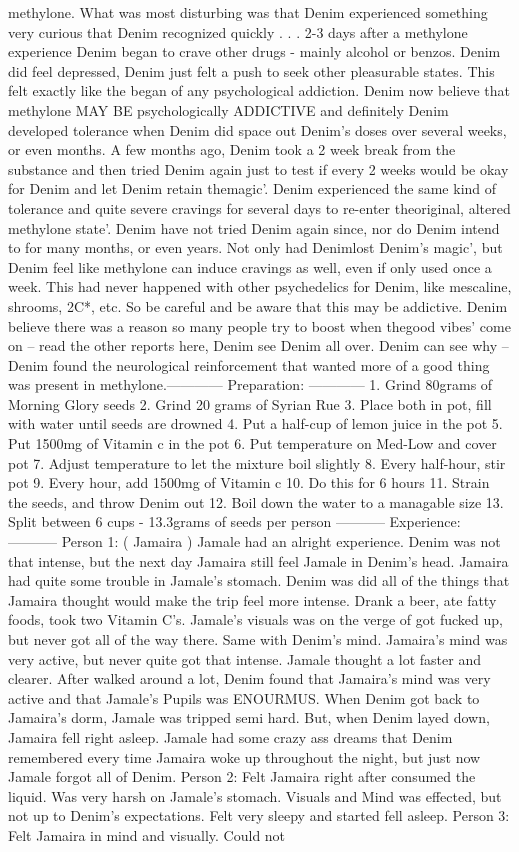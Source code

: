 \documentclass[12pt]{book}
\begin{document}
methylone. What was most disturbing was that Denim experienced something very curious that Denim recognized quickly . . .  2-3 days after a methylone experience Denim began to crave other drugs - mainly alcohol or benzos. Denim did feel depressed, Denim just felt a push to seek other pleasurable states. This felt exactly like the began of any psychological addiction. Denim now believe that methylone MAY BE psychologically ADDICTIVE and definitely Denim developed tolerance when Denim did space out Denim's doses over several weeks, or even months. A few months ago, Denim took a 2 week break from the substance and then tried Denim again just to test if every 2 weeks would be okay for Denim and let Denim retain themagic'. Denim experienced the same kind of tolerance and quite severe cravings for several days to re-enter theoriginal, altered methylone state'. Denim have not tried Denim again since, nor do Denim intend to for many months, or even years. Not only had Denimlost Denim's magic', but Denim feel like methylone can induce cravings as well, even if only used once a week. This had never happened with other psychedelics for Denim, like mescaline, shrooms, 2C*, etc. So be careful and be aware that this may be addictive. Denim believe there was a reason so many people try to boost when thegood vibes' come on -- read the other reports here, Denim see Denim all over. Denim can see why -- Denim found the neurological reinforcement that wanted more of a good thing was present in methylone.------------ Preparation: ------------ 1. Grind 80grams of Morning Glory seeds 2. Grind 20 grams of Syrian Rue 3. Place both in pot, fill with water until seeds are drowned 4. Put a half-cup of lemon juice in the pot 5. Put 1500mg of Vitamin c in the pot 6. Put temperature on Med-Low and cover pot 7. Adjust temperature to let the mixture boil slightly 8. Every half-hour, stir pot 9. Every hour, add 1500mg of Vitamin c 10. Do this for 6 hours 11. Strain the seeds, and throw Denim out 12. Boil down the water to a managable size 13. Split between 6 cups - 13.3grams of seeds per person ----------- Experience: ----------- Person 1: ( Jamaira ) Jamale had an alright experience. Denim was not that intense, but the next day Jamaira still feel Jamale in Denim's head. Jamaira had quite some trouble in Jamale's stomach. Denim was did all of the things that Jamaira thought would make the trip feel more intense. Drank a beer, ate fatty foods, took two Vitamin C's. Jamale's visuals was on the verge of got fucked up, but never got all of the way there. Same with Denim's mind. Jamaira's mind was very active, but never quite got that intense. Jamale thought a lot faster and clearer. After walked around a lot, Denim found that Jamaira's mind was very active and that Jamale's Pupils was ENOURMUS. When Denim got back to Jamaira's dorm, Jamale was tripped semi hard. But, when Denim layed down, Jamaira fell right asleep. Jamale had some crazy ass dreams that Denim remembered every time Jamaira woke up throughout the night, but just now Jamale forgot all of Denim. Person 2: Felt Jamaira right after consumed the liquid. Was very harsh on Jamale's stomach. Visuals and Mind was effected, but not up to Denim's expectations. Felt very sleepy and started fell asleep. Person 3: Felt Jamaira in mind and visually. Could not 
\end{document}
